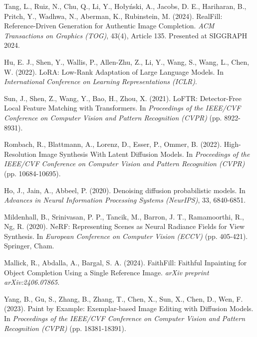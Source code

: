 \documentclass{article}
\begin{document}
{
\small %

\begin{thebibliography}{99} %

    Tang, L., Ruiz, N., Chu, Q., Li, Y., Hołyński, A., Jacobs, D. E., Hariharan, B., Pritch, Y., Wadhwa, N., Aberman, K.,
    Rubinstein, M. (2024).
    RealFill: Reference-Driven Generation for Authentic Image Completion.
    \textit{ACM Transactions on Graphics (TOG)}, 43(4), Article 135. Presented at SIGGRAPH 2024.

    Hu, E. J., Shen, Y., Wallis, P., Allen-Zhu, Z., Li, Y., Wang, S., Wang, L.,
    Chen, W. (2022).
    LoRA: Low-Rank Adaptation of Large Language Models.
    In \textit{International Conference on Learning Representations (ICLR)}.

    Sun, J., Shen, Z., Wang, Y., Bao, H., Zhou, X. (2021).
    LoFTR: Detector-Free Local Feature Matching with Transformers.
    In \textit{Proceedings of the IEEE/CVF Conference on Computer Vision and Pattern Recognition (CVPR)} (pp. 8922-8931).

    Rombach, R., Blattmann, A., Lorenz, D., Esser, P., Ommer, B. (2022).
    High-Resolution Image Synthesis With Latent Diffusion Models.
    In \textit{Proceedings of the IEEE/CVF Conference on Computer Vision and Pattern Recognition (CVPR)} (pp. 10684-10695).

    Ho, J., Jain, A.,
    Abbeel, P. (2020).
    Denoising diffusion probabilistic models.
    In \textit{Advances in Neural Information Processing Systems (NeurIPS)}, 33, 6840-6851.

    Mildenhall, B., Srinivasan, P. P., Tancik, M., Barron, J. T., Ramamoorthi, R.,
    Ng, R. (2020).
    NeRF: Representing Scenes as Neural Radiance Fields for View Synthesis.
    In \textit{European Conference on Computer Vision (ECCV)} (pp. 405-421). Springer, Cham.

    Mallick, R., Abdalla, A., Bargal, S. A. (2024).
    FaithFill: Faithful Inpainting for Object Completion Using a Single Reference Image.
    \textit{arXiv preprint arXiv:2406.07865}.

    Yang, B., Gu, S., Zhang, B., Zhang, T., Chen, X., Sun, X., Chen, D.,
    Wen, F. (2023).
    Paint by Example: Exemplar-based Image Editing with Diffusion Models.
    In \textit{Proceedings of the IEEE/CVF Conference on Computer Vision and Pattern Recognition (CVPR)} (pp. 18381-18391).


\end{thebibliography}}
\end{document}
